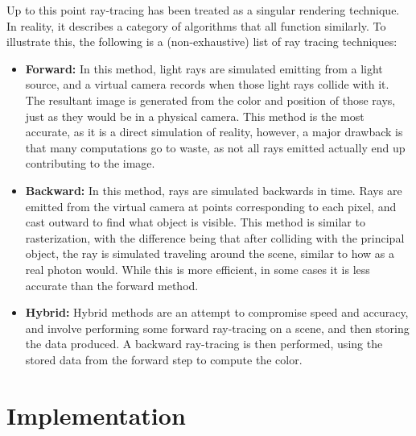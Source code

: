 \documentclass[10pt]{IEEEtran}
\begin{document}
Up to this point ray-tracing has been treated as a singular rendering technique. In reality, it
describes a category of algorithms that all function similarly. To illustrate this, the following is
a (non-exhaustive) list of ray tracing \cite{stanfordRayTracingTypes} techniques:
\begin{itemize}
    \item \textbf{Forward:} In this method, light rays are simulated emitting from a light source,
    and a virtual camera records when those light rays collide with it. The resultant image is
    generated from the color and position of those rays, just as they would be in a physical camera.
    This method is the most accurate, as it is a direct simulation of reality, however, a major
    drawback is that many computations go to waste, as not all rays emitted actually end up
    contributing to the image.
    \item \textbf{Backward:} In this method, rays are simulated backwards in time. Rays are emitted
    from the virtual camera at points corresponding to each pixel, and cast outward to find what
    object is visible. This method is similar to rasterization, with the difference being that after
    colliding with the principal object, the ray is simulated traveling around the scene, similar to
    how as a real photon would. While this is more efficient, in some cases it is less accurate than
    the forward method.
    \item \textbf{Hybrid:} Hybrid methods are an attempt to compromise speed and accuracy, and
    involve performing some forward ray-tracing on a scene, and then storing the data produced. A
    backward ray-tracing is then performed, using the stored data from the forward step to compute
    the color.
\end{itemize}

\section*{Implementation}
\end{document}
